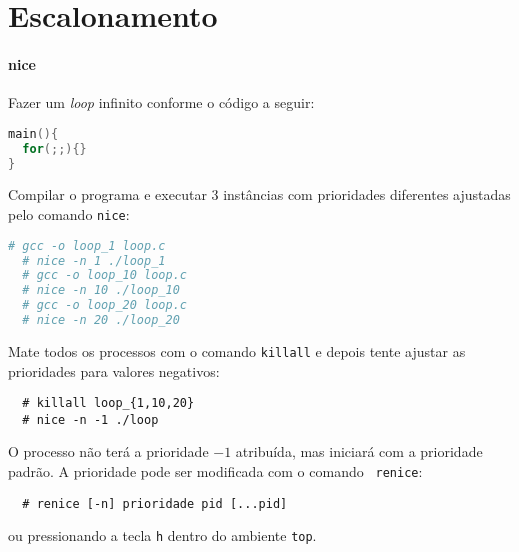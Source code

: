 
\section*{Escalonamento}

\paragraph{nice} Fazer um {\em loop} infinito conforme o código a
seguir:

\begin{lstlisting}[name=a,language=c]
main(){
  for(;;){}
}  
\end{lstlisting}

Compilar o programa e executar 3 instâncias com prioridades diferentes
ajustadas pelo comando {\tt nice}:

\begin{lstlisting}[language=bash,]
  # gcc -o loop_1 loop.c
  # nice -n 1 ./loop_1
  # gcc -o loop_10 loop.c
  # nice -n 10 ./loop_10
  # gcc -o loop_20 loop.c
  # nice -n 20 ./loop_20
\end{lstlisting}

Mate todos os processos com o comando {\tt killall} e depois tente
ajustar as prioridades para valores negativos:

\begin{lstlisting}
  # killall loop_{1,10,20}
  # nice -n -1 ./loop
\end{lstlisting}

O processo não terá a prioridade $-1$ atribuída, mas iniciará com a
prioridade padrão. A prioridade pode ser modificada com o comando {\tt
renice}:

\begin{lstlisting}
  # renice [-n] prioridade pid [...pid] 
\end{lstlisting}

\noindent ou pressionando a tecla {\tt h} dentro do ambiente {\tt top}.

